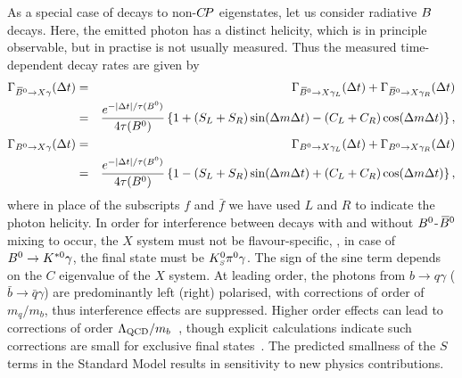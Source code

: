 As a special case of decays to non-$C\!P$ eigenstates,
let us consider radiative $B$ decays.
Here, the emitted photon has a distinct helicity,
which is in principle observable, but in practise is not usually measured.
Thus the measured time-dependent decay rates 
are given by~\cite{Atwood:1997zr,Atwood:2004jj}
\begin{eqnarray}
  \Gamma_{\kern 0.18em\overline{\kern -0.18em B}{}^0 \to X \gamma} (\Delta t) & = &
  \Gamma_{\kern 0.18em\overline{\kern -0.18em B}{}^0 \to X \gamma_L} (\Delta t) + \Gamma_{\kern 0.18em\overline{\kern -0.18em B}{}^0 \to X \gamma_R} (\Delta t) \\ \nonumber
  & = &
  \frac{e^{-\left| \Delta t \right| / \tau(B^0)}}{4\tau(B^0)} 
  \left\{ 
    1 + 
    \left( S_L + S_R \right) \sin(\Delta m \Delta t) - 
    \left( C_L + C_R \right) \cos(\Delta m \Delta t) 
  \right\},
  \\
  \Gamma_{B^0 \to X \gamma} (\Delta t) & = & 
  \Gamma_{B^0 \to X \gamma_L} (\Delta t) + \Gamma_{B^0 \to X \gamma_R} (\Delta t) \\ \nonumber 
  & = &
  \frac{e^{-\left| \Delta t \right| / \tau(B^0)}}{4\tau(B^0)} 
  \left\{ 
    1 - 
    \left( S_L + S_R \right) \sin(\Delta m \Delta t) + 
    \left( C_L + C_R \right) \cos(\Delta m \Delta t) 
  \right\},
\end{eqnarray}
where in place of the subscripts $f$ and $\bar{f}$ we have used $L$ and $R$
to indicate the photon helicity.
In order for interference between decays with and without $B^0$-$\kern 0.18em\overline{\kern -0.18em B}{}^0$ mixing
to occur, the $X$ system must not be flavour-specific,
\eg, in case of $B^0 \to K^{*0}\gamma$, the final state must be $K^0_{\scriptscriptstyle S} \pi^0 \gamma$.
The sign of the sine term depends on the $C$ eigenvalue of the $X$ system.
At leading order, the photons from 
$b \to q \gamma$ ($\bar{b} \to \bar{q} \gamma$) are predominantly
left (right) polarised, with corrections of order of $m_q/m_b$,
thus interference effects are suppressed.
Higher order effects can lead to corrections of order 
$\Lambda_{\rm QCD}/m_b$~\cite{Grinstein:2004uu,Grinstein:2005nu},
though explicit calculations indicate such corrections are small
for exclusive final states~\cite{Matsumori:2005ax,Ball:2006cva}.
The predicted smallness of the $S$ terms in the Standard Model
results in sensitivity to new physics contributions.


